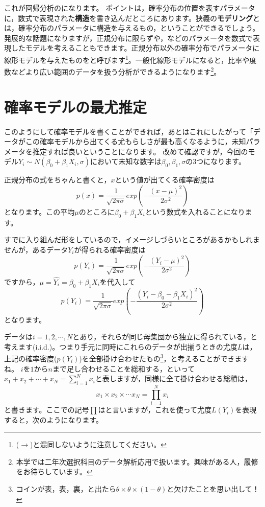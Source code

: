\documentclass{ltjbook}
\begin{document}
これが回帰分析のになります。
ポイントは，確率分布の位置を表すパラメータに，数式で表現された\textbf{構造}を書き込んだところにあります。狭義の\textbf{モデリング}とは，確率分布のパラメータに構造を与えるもの，ということができるでしょう。
発展的な話題になりますが，正規分布に限らずや，などのパラメータを数式で表現したモデルを考えることもできます。正規分布以外の確率分布でパラメータに線形モデルを与えたものをと呼びます\footnote{($\to$\pageref{GeneralLinearModel})と混同しないように注意してください。}。一般化線形モデルになると，比率や度数などより広い範囲のデータを扱う分析ができるようになります\footnote{本学では二年次選択科目のデータ解析応用で扱います。興味がある人，履修をお待ちしています。}。

\section{確率モデルの最尤推定}

このようにして確率モデルを書くことができれば，あとはこれにしたがって「データがこの確率モデルから出てくる尤もらしさが最も高くなるように，未知パラメータを推定すれば良いということになります。
改めて確認ですが，今回のモデル$Y_i \sim N(\beta_0 + \beta_1X_i, \sigma)$において未知な数字は$\beta_0,\beta_1,\sigma$の3つになります。


正規分布の式をちゃんと書くと，$x$という値が出てくる確率密度は
\[ p(x) = \frac{1}{\sqrt{2\pi \sigma}}exp\left( - \frac{(x-\mu)^2}{2\sigma^2}\right)\]
となります。この平均$\mu$のところに$\beta_0 + \beta_1 X_i$という数式を入れることになります。

すでに入り組んだ形をしているので，イメージしづらいところがあるかもしれませんが，あるデータ$Y_i$が得られる確率密度は
\[ p(Y_i) = \frac{1}{\sqrt{2\pi \sigma}}exp\left( -\frac{(Y_i-\mu)^2}{2\sigma^2}\right)\]
ですから，$\mu=\hat{Y_i} = \beta_0 + \beta_1 X_i$を代入して
\[ p(Y_i) = \frac{1}{\sqrt{2\pi \sigma}}exp\left( -\frac{(Y_i-\beta_0 - \beta_1 X_i)^2}{2\sigma^2}\right)\]
となります。

データは$i = 1,2,\cdots,N$とあり，それらが同じ母集団から独立に得られている，と考えます(i.i.d.)。つまり手元に同時にこれらのデータが出揃うときの尤度$L$は，上記の確率密度($p(Y_i)$)を全部掛け合わせたもの\footnote{コインが表，表，裏，と出たら$\theta \times \theta \times (1-\theta)$と欠けたことを思い出して！}，と考えることができますね。
$i$を$1$から$n$まで足し合わせることを総和する，といって$x_1+x_2+\cdots+x_N=\sum_{i=1}^N x_i$と表しますが，同様に全て掛け合わせる総積は，
\[ x_1 \times x_2 \times \cdots x_N = \prod_{i=1}^N x_i \]
と書きます。ここでの記号$\prod$はと言いますが，これを使って尤度$L(Y_i)$を表現すると，次のようになります。
\end{document}
